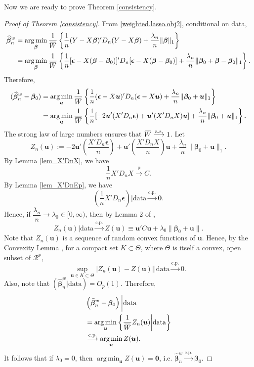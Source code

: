 \documentclass[12pt]{article}
\DeclareMathOperator*{\argmin}{arg\,min} %
\newcommand{\bnw}{\widehat{\bm{\beta}}_n^w} %
\newcommand{\be}{\bm{\beta}} %
\newcommand{\ep}{\bm{\epsilon}} %
\newcommand{\dn}{\dfrac{1}{n}} %
\newcommand{\CONV}[1]{\stackrel{\text{#1}}{\longrightarrow}} %
\newcommand{\overbar}[1]{\mkern 2mu\overline{\mkern-2mu#1\mkern-2mu}\mkern 2mu}
\newcommand{\bu}{\bm{u}} %
\begin{document}
Now we are ready to prove Theorem \ref{consistency}. 

\begin{proof} [Proof of Theorem \ref{consistency}]
	From \eqref{weighted.lasso.obj2}, conditional on data, 
	\begin{align*}
	\bnw &= \argmin_{\be}
					\dfrac{1}{\overbar{W}}
					\left\{
							\dn (Y - X \be)' D_n (Y - X \be)  
							+ \dfrac{\lambda_n}{n} \| \be \|_1
					\right\} \\
		 &= \argmin_{\be}
		 			\dfrac{1}{\overbar{W}}
		 			\left\{
		 					\dn [\ep - X (\be - \be_0)]' D_n [\ep - X (\be - \be_0)]
		 					+ \dfrac{\lambda_n}{n} \| \be_0 + \be - \be_0 \|_1  
		 			\right\}.  
	\end{align*}
	Therefore, 
	\begin{align*}
	(\bnw - \be_0) &= \argmin_{\bu}
							 \dfrac{1}{\overbar{W}}
							 \left\{
		 							\dn (\ep - X \bu)' D_n (\ep - X \bu)
									+ \dfrac{\lambda_n}{n} \| \be_0 + \bu \|_1  
							 \right\} \\
				   &= \argmin_{\bu}
							 \dfrac{1}{\overbar{W}}
							 \left\{
							 		\dn [-2 \bu' (X' D_n \ep) + \bu' (X' D_n X) \bu]
							 		+ \dfrac{\lambda_n}{n} \| \be_0 + \bu \|_1  
							 \right\}. 
	\end{align*}
	The strong law of large numbers ensures that $\overbar{W} \CONV{a.s.} 1$. Let
	$$
	Z_n(\bu) 
	:= -2 \bu' \left( \dfrac{X' D_n \ep}{n} \right) 
		+ \bu' \left( \dfrac{X' D_n X}{n} \right) \bu 
		+ \dfrac{\lambda_n}{n} \| \be_0 + \bu \|_1. 
	$$ 
	By Lemma \ref{lem_X'DnX}, we have 
	$$
	\dn X' D_n X \CONV{p} C.
	$$
	By Lemma \ref{lem_X'DnEp}, we have 
	$$
	\left( \dn X' D_n \ep \right) \bigg| \text{data} \CONV{c.p.} \bm{0}.
	$$
	Hence,  if $\dfrac{\lambda_n}{n} \to \lambda_0 \in [0 , \infty)$, then by Lemma 2 of \citet{newton1991}, 
	$$
	Z_n(\bu) \big| \text{data}  \CONV{c.p.} Z(\bu) \equiv \bu' C \bu + \lambda_0 \| \be_0 + \bu \|.
	$$
	Note that $Z_n(\bu)$ is a sequence of random convex functions of $\bu$. Hence, by the Convexity Lemma \citep{Pollard1991}, for a compact set $K \subset \Theta$, where $\Theta$ is itself a convex, open subset of $\mathcal{R}^p$,
	$$
	\underset{\bu \in K \subset \Theta}{\text{sup}} \; 
	|Z_n (\bu) - Z (\bu)|
	\bigg| \text{data}
	\CONV{c.p.} 0. 	
	$$
	Also, note that $ \left( \bnw \big| \text{data} \right) = O_p(1)$.
	Therefore,
	\begin{align*}
	&\left( \bnw - \be_0 \right) \bigg| \text{data} \\  
	&= 	\argmin_{\bu}
		\left\{
			\dfrac{1}{\overbar{W}} Z_n(\bu)
			\bigg| \text{data}  
		\right\} \\ 
	&\CONV{c.p.} \argmin_{\bu} Z(\bu).
	\end{align*} 
	It follows that if $\lambda_0 = 0$, then $\argmin_{\bu} Z(\bu) = \bm{0}$, i.e. $\bnw \CONV{c.p.} \be_0$.
\end{proof}
\end{document}
